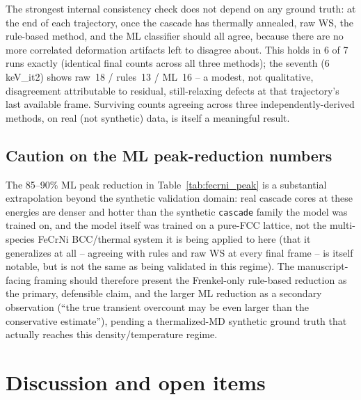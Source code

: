 \documentclass[11pt]{article}
\newcommand{\code}[1]{\texttt{#1}}
\begin{document}
The strongest internal consistency check does not depend on any ground truth: at the end of each
trajectory, once the cascade has thermally annealed, raw WS, the rule-based method, and the ML
classifier should all agree, because there are no more correlated deformation artifacts left to
disagree about. This holds in 6 of 7 runs exactly (identical final counts across all three
methods); the seventh (6\,keV\_it2) shows raw~18 / rules~13 / ML~16 -- a modest, not qualitative,
disagreement attributable to residual, still-relaxing defects at that trajectory's last available
frame. Surviving counts agreeing across three independently-derived methods, on real (not
synthetic) data, is itself a meaningful result.

\subsection{Caution on the ML peak-reduction numbers}

The 85--90\% ML peak reduction in Table~\ref{tab:fecrni_peak} is a substantial extrapolation beyond
the synthetic validation domain: real cascade cores at these energies are denser and hotter than
the synthetic \code{cascade} family the model was trained on, and the model itself was trained on a
pure-FCC lattice, not the multi-species FeCrNi BCC/thermal system it is being applied to here (that
it generalizes at all -- agreeing with rules and raw WS at every final frame -- is itself notable,
but is not the same as being validated in this regime). The manuscript-facing framing should
therefore present the Frenkel-only rule-based reduction as the primary, defensible claim, and the
larger ML reduction as a secondary observation (``the true transient overcount may be even larger
than the conservative estimate''), pending a thermalized-MD synthetic ground truth that actually
reaches this density/temperature regime.

\section{Discussion and open items}
\end{document}

